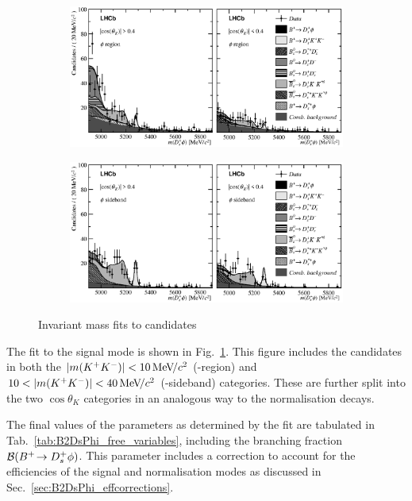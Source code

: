 \begin{figure}[!h]
    \centering
    \begin{subfigure}[t]{1.0\textwidth}
        \includegraphics[width=1.0\textwidth]{figs/B2DsPhi/Fig4a.eps}
    \end{subfigure}
    \begin{subfigure}[t]{1.0\textwidth}
        \includegraphics[width=1.0\textwidth]{figs/B2DsPhi/Fig4b.eps}
    \end{subfigure}
    \caption{Invariant mass fits to \decay{\Bp}{\Dsp\phiz} candidates}
    \label{fig:B2DsPhi_Signal_Fit}
\end{figure}

The fit to the signal mode is shown in Fig.~\ref{fig:B2DsPhi_Signal_Fit}. This figure includes the \decay{\Bp}{\Dsp\phiz} candidates in both the $|m({{K}^+}{{K}^-})| < 10{\mathrm{\,Me\kern -0.1em V\!/}c^2}$ (\phiz-region) and $10< |m({{K}^+}{{K}^-})| < 40{\mathrm{\,Me\kern -0.1em V\!/}c^2}$ (\phiz-sideband) categories. These are further split into the two $\cos\theta_{K}$ categories in an analogous way to the normalisation decays.



The final values of the parameters as determined by the fit are tabulated in Tab.~\ref{tab:B2DsPhi_free_variables}, including the branching fraction ${\mathcal{B}}({{{B}^+}}\!\rightarrow {\ensuremath{{D}^+_{s}}}\phi)$. This parameter includes a correction to account for the efficiencies of the signal and normalisation modes as discussed in Sec.~\ref{sec:B2DsPhi_effcorrections}. 

